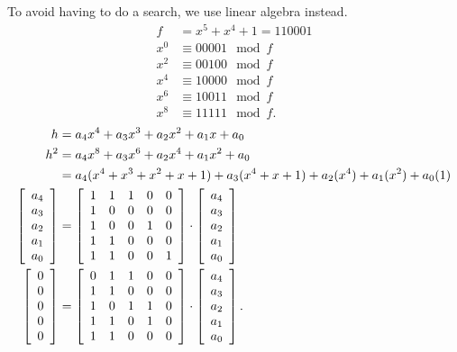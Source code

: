 \documentclass[10pt]{article}
\numberwithin{equation}{subsection}
\begin{document}
To avoid having to do a search, we use linear algebra instead.
\begin{align*}
	f &= x^5+x^4+1 = 110001 \\
	x^0 &\equiv 00001 \mod f \\
	x^2 &\equiv 00100 \mod f \\
	x^4 &\equiv 10000 \mod f \\
	x^6 &\equiv 10011 \mod f \\
	x^8 &\equiv 11111 \mod f.
\end{align*}
\begin{align*}
h   &= a_4 x^4 + a_3 x^3 + a_2 x^2 + a_1 x   + a_0 \\
h^2 &= a_4 x^8 + a_3 x^6 + a_2 x^4 + a_1 x^2 + a_0 \\
    &= a_4(x^4+x^3+x^2+x+1) + a_3(x^4+x+1) + a_2(x^4) + a_1(x^2) + a_0(1) \\
%
%
\bcmatrix{
	a_4 \\
	a_3 \\
	a_2 \\
	a_1 \\
	a_0 \\
}
&=
\bcmatrix{
1 & 1 & 1 & 0 & 0 \\
1 & 0 & 0 & 0 & 0 \\
1 & 0 & 0 & 1 & 0 \\
1 & 1 & 0 & 0 & 0 \\
1 & 1 & 0 & 0 & 1 \\
}
\cdot
\bcmatrix{
	a_4 \\
	a_3 \\
	a_2 \\
	a_1 \\
	a_0 \\
} \\
%
\bcmatrix{
	0 \\
	0 \\
	0 \\
	0 \\
	0 \\
}
&=
\bcmatrix{
0 & 1 & 1 & 0 & 0 \\
1 & 1 & 0 & 0 & 0 \\
1 & 0 & 1 & 1 & 0 \\
1 & 1 & 0 & 1 & 0 \\
1 & 1 & 0 & 0 & 0 \\
}
\cdot
\bcmatrix{
	a_4 \\
	a_3 \\
	a_2 \\
	a_1 \\
	a_0 \\
}.
\end{align*}
\end{document}
